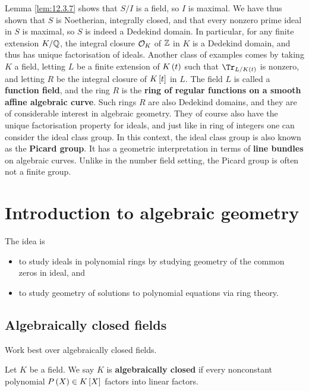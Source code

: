 Lemma \ref{lem:12.3.7} shows that $ S / I $ is a field, so $ I $ is maximal. We have thus shown that $ S $ is Noetherian, integrally closed, and that every nonzero prime ideal in $ S $ is maximal, so $ S $ is indeed a Dedekind domain. In particular, for any finite extension $ K / \mathbb{Q} $, the integral closure $ \mathcal{O}_K $ of $ \mathbb{Z} $ in $ K $ is a Dedekind domain, and thus has unique factorisation of ideals. Another class of examples comes by taking $ K $ a field, letting $ L $ be a finite extension of $ K\br{t} $ such that $ \Tr_{L / K\br{t}} $ is nonzero, and letting $ R $ be the integral closure of $ K\sbr{t} $ in $ L $. The field $ L $ is called a \textbf{function field}, and the ring $ R $ is the \textbf{ring of regular functions on a smooth affine algebraic curve}. Such rings $ R $ are also Dedekind domains, and they are of considerable interest in algebraic geometry. They of course also have the unique factorisation property for ideals, and just like in ring of integers one can consider the ideal class group. In this context, the ideal class group is also known as the \textbf{Picard group}. It has a geometric interpretation in terms of \textbf{line bundles} on algebraic curves. Unlike in the number field setting, the Picard group is often not a finite group.

\pagebreak

\section{Introduction to algebraic geometry}


The idea is
\begin{itemize}
\item to study ideals in polynomial rings by studying geometry of the common zeros in ideal, and
\item to study geometry of solutions to polynomial equations via ring theory.
\end{itemize}

\subsection{Algebraically closed fields}

Work best over algebraically closed fields.

\begin{definition}
Let $ K $ be a field. We say $ K $ is \textbf{algebraically closed} if every nonconstant polynomial $ P\br{X} \in K\sbr{X} $ factors into linear factors.
\end{definition}

